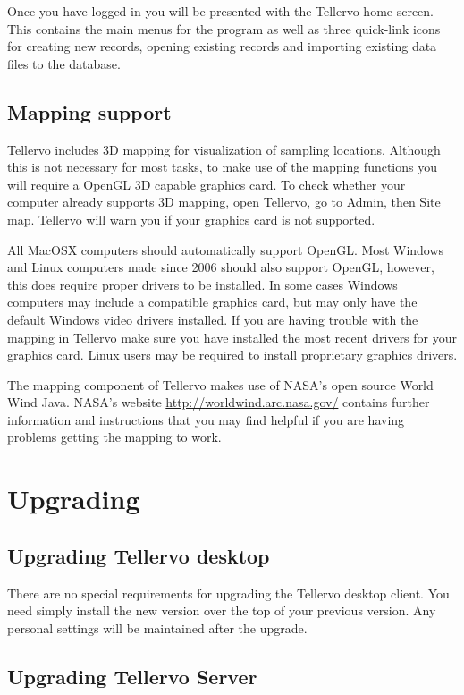 Once you have logged in you will be presented with the Tellervo home screen.  This contains the main menus for the program as well as three quick-link icons for creating new records, opening existing records and importing existing data files to the database.


\subsection{Mapping support}
Tellervo includes 3D mapping for visualization of sampling locations. Although this is not necessary for most tasks, to make use of the mapping functions you will require a OpenGL 3D capable graphics card. To check whether your computer already supports 3D mapping, open Tellervo, go to Admin, then Site map.  Tellervo will warn you if your graphics card is not supported.

All MacOSX computers should automatically support OpenGL.  Most Windows and Linux computers made since 2006 should also support OpenGL, however, this does require proper drivers to be installed. In some cases Windows computers may include a compatible graphics card, but may only have the default Windows video drivers installed.  If you are having trouble with the mapping in Tellervo make sure you have installed the most recent drivers for your graphics card.  Linux users may be required to install proprietary graphics drivers.  

The mapping component of Tellervo makes use of NASA's open source World Wind Java.  NASA's website \url{http://worldwind.arc.nasa.gov/} contains further information and instructions that you may find helpful if you are having problems getting the mapping to work.  

\section{Upgrading}

\subsection{Upgrading Tellervo desktop}

There are no special requirements for upgrading the Tellervo desktop client.  You need simply install the new version over the top of your previous version.  Any personal settings will be maintained after the upgrade.

\subsection{Upgrading Tellervo Server}




